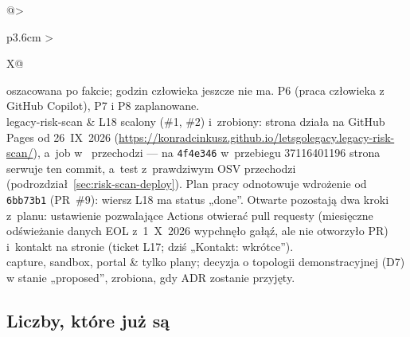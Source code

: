 \begin{xltabular}{\linewidth}{@{}>{\raggedright\arraybackslash}p{3.6cm} >{\raggedright\arraybackslash}X@{}}
oszacowana po fakcie; godzin człowieka jeszcze nie ma. P6 (praca człowieka z GitHub
Copilot), P7 i P8 zaplanowane. \\
legacy-risk-scan & L18 scalony (\#1, \#2) i~zrobiony: strona działa na GitHub Pages od
26~IX~2026 (\url{https://konradcinkusz.github.io/letsgolegacy.legacy-risk-scan/}), a~job
 w~ przechodzi --- na \texttt{4f4e346} w~przebiegu
37116401196 strona serwuje ten commit, a~test z~prawdziwym OSV przechodzi
(podrozdział~\ref{sec:risk-scan-deploy}). Plan pracy odnotowuje wdrożenie od
\texttt{6bb73b1} (PR~\#9): wiersz L18 ma status „done”. Otwarte pozostają dwa kroki z~planu: ustawienie pozwalające
Actions otwierać pull requesty (miesięczne odświeżanie danych EOL z~1~X~2026 wypchnęło
gałąź, ale nie otworzyło PR) i~kontakt na stronie (ticket L17; dziś „Kontakt: wkrótce”). \\
capture, sandbox, portal & tylko plany; decyzja o topologii demonstracyjnej (D7) w stanie
„proposed”, zrobiona, gdy ADR zostanie przyjęty. \\
\bottomrule
\end{xltabular}


\subsection{Liczby, które już są}\label{sec:status-liczby}

